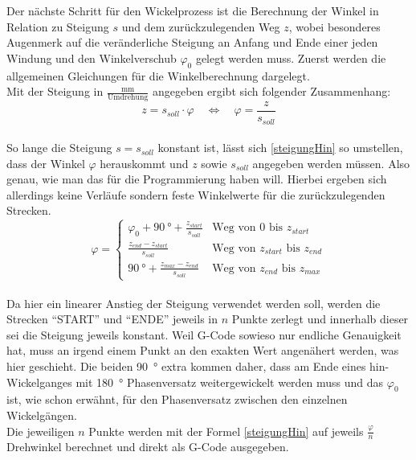\documentclass[12pt, a4paper, ngerman]{article}
\begin{document}
Der nächste Schritt für den Wickelprozess ist die Berechnung der Winkel in Relation zu Steigung $s$ und dem zurückzulegenden Weg $z$, wobei besonderes Augenmerk auf die veränderliche Steigung an Anfang und Ende einer jeden Windung und den Winkelverschub $\varphi_0$ gelegt werden muss. Zuerst werden die allgemeinen Gleichungen für die Winkelberechnung dargelegt.\\
Mit der Steigung in $\frac{\text{mm}}{\text{Umdrehung}}$ angegeben ergibt sich folgender Zusammenhang:\\
\begin{equation}\label{SteigungMalWinkel}
	z = s_{soll} \cdot \varphi \quad \iff \quad \varphi = \frac{z}{s_{soll}}
\end{equation}\\
So lange die Steigung $s = s_{soll}$ konstant ist, lässt sich \eqref{steigungHin} so umstellen, dass der Winkel $\varphi$ herauskommt und $z$ sowie $s_{soll}$ angegeben werden müssen. Also genau, wie man das für die Programmierung haben will. Hierbei ergeben sich allerdings keine Verläufe sondern feste Winkelwerte für die zurückzulegenden Strecken.
\begin{equation}\label{GesamtwegeHinRück}
	\varphi =
	\begin{cases}
		\varphi_0 + \SI{90}{\degree} + \frac{z_{start}}{s_{soll}} & \text{Weg von 0 bis $z_{start}$}\\ 
		\frac{z_{end} - z_{start}}{s_{soll}} & \text{Weg von $z_{start}$ bis $z_{end}$}\\
		\SI{90}{\degree} + \frac{z_{max} - z_{end}}{s_{soll}} & \text{Weg von $z_{end}$ bis $z_{max}$}
	\end{cases}	
\end{equation}\\
Da hier ein linearer Anstieg der Steigung verwendet werden soll, werden die Strecken \enquote{START} und \enquote{ENDE} jeweils in $n$ Punkte zerlegt und innerhalb dieser sei die Steigung jeweils konstant. Weil G-Code sowieso nur endliche Genauigkeit hat, muss an irgend einem Punkt an den exakten Wert angenähert werden, was hier geschieht. Die beiden \SI{90}{\degree} extra kommen daher, dass am Ende eines hin-Wickelganges mit \SI{180}{\degree} Phasenversatz weitergewickelt werden muss und das $\varphi_0$ ist, wie schon erwähnt, für den Phasenversatz zwischen den einzelnen Wickelgängen.\\
Die jeweiligen $n$ Punkte werden mit der Formel \eqref{steigungHin} auf jeweils $\frac{\varphi}{n}$ Drehwinkel berechnet und direkt als G-Code ausgegeben.
\end{document}
